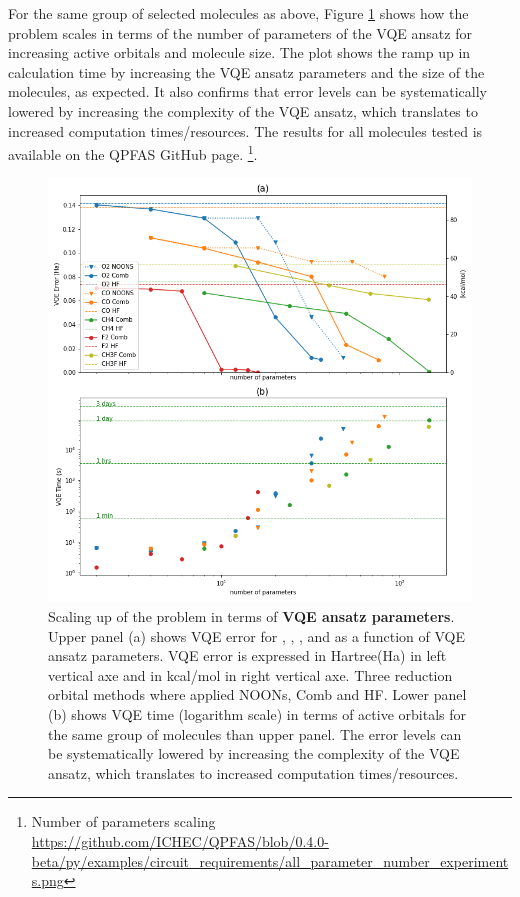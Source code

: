 \documentclass[journal,onecolumn]{IEEEtran}
\begin{document}
For the same group of selected molecules as above, Figure \ref{fig:parameter_number_experiments} shows how the problem scales in terms of the number of parameters of the VQE ansatz for increasing active orbitals and molecule size. 
The plot shows the ramp up in calculation time by increasing the VQE ansatz parameters and the size of the molecules, as expected.
It also confirms that error levels can be systematically lowered by increasing the complexity of the VQE ansatz, which translates to increased computation times/resources.
The results for all molecules tested is available on the QPFAS GitHub page. \footnote{Number of parameters scaling \url{https://github.com/ICHEC/QPFAS/blob/0.4.0-beta/py/examples/circuit_requirements/all_parameter_number_experiments.png}}.

\begin{figure}[!htb]
\centering
\includegraphics[width=\textwidth]{parameter_number_experiments.png}
\caption{Scaling up of the problem in terms of \textbf{ VQE ansatz parameters}. Upper panel (a) shows VQE error for , , ,  and  as a function of VQE ansatz parameters. VQE error is expressed in Hartree(Ha) in left vertical axe and in kcal/mol in right vertical axe. Three reduction orbital methods where applied NOONs, Comb and HF. Lower panel (b) shows VQE time (logarithm scale) in terms of active orbitals for the same group of molecules than upper panel. The error levels can be systematically lowered by increasing the complexity of the VQE ansatz, which translates to increased computation times/resources.}
\label{fig:parameter_number_experiments}
\end{figure}
\end{document}
